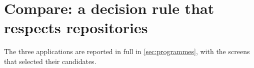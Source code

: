 \section{Compare: a decision rule that respects repositories}\label{sec:compare}



The three applications are reported in full in \cref{sec:programmes}, with the screens that selected their candidates.

